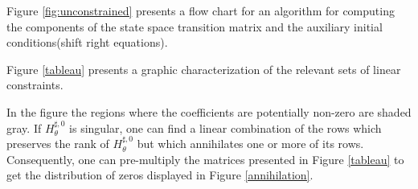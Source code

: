 \documentclass{article}
\begin{document}
{Figure \ref{fig:unconstrained} presents  a flow chart for 
an algorithm for computing the 
components of the state space transition matrix and the auxiliary initial
conditions(shift right equations).

\begin{figure*}[htbp]
  \begin{center}
    \leavevmode
{}
    \caption{Algorithm to Compute Unconstrained Auto-regression: Algorithm \ref{alg:unconstrainedAR}:$\mathcal{F}_1(\mathcal{H})$}
    \label{fig:unconstrained}
  \end{center}
\end{figure*}

Figure \ref{tableau} presents a graphic characterization of the relevant
sets of linear constraints.
\begin{figure*}[htbp]
  \begin{center}
    \leavevmode
    

    \caption{Matrix Tableau Characterization of Algorithm: Initial Tableau}
    \label{tableau}
  \end{center}
\end{figure*}
In the figure the regions where the coefficients are potentially  non-zero are shaded gray. If $H^{\sharp,0}_\theta$ is singular, one can find a linear 
combination of the rows which  preserves the rank of $H^{\sharp,0}_\theta$ but
which annihilates one or more of its rows.  Consequently, one can pre-multiply
the matrices presented in Figure \ref{tableau} to get the distribution of
zeros displayed in Figure \ref{annihilation}.
\begin{figure*}[htbp]
  \begin{center}
    \leavevmode
    

\end{center}
\end{figure*}}
\end{document}
